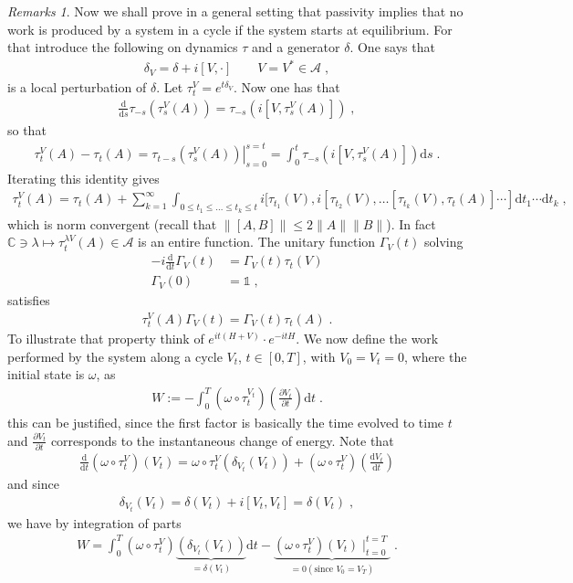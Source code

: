 \documentclass[
a4paper, %
11pt, %
onecolumn, %
openany, %
]{memoir}
\theoremstyle{definition}
\theoremstyle{remark}
\newtheorem{remarks}{Remarks}[chapter]
\theoremstyle{plain}
\begin{document}
\begin{remarks}
Now we shall prove in a general setting that passivity implies that no work is produced by a system in a cycle if the system starts at equilibrium. For that introduce the following on dynamics $\tau$ and a generator $\delta$. One says that \begin{align}
\delta_V=\delta + i[V,\cdot] \qquad V=V^*\in\mathcal{A}\; ,
\end{align}
is a local perturbation of $\delta$. Let $\tau_t^V=e^{t\delta_V}$. Now one has that \begin{align}
\frac{\mathrm{d}}{\mathrm{d}s}\tau_{-s}(\tau_s^V(A))=\tau_{-s}(i[V,\tau_s^V(A)])\; ,
\end{align}
so that \begin{align}
\left.\tau_t^V(A)-\tau_t(A)=\tau_{t-s}(\tau_s^V(A))\right|_{s=0}^{s=t}=\int_0^t\tau_{-s}(i[V,\tau_s^V(A)])\mathrm{d}s\; .
\end{align}
Iterating this identity gives \begin{align}
\tau_t^V(A)=\tau_t(A)+\sum_{k=1}^{\infty}\int_{{0\leq t_1\leq \ldots\leq t_k\leq t}} i[\tau_{t_1}(V),i[\tau_{t_2}(V),\ldots [\tau_{t_k}(V),\tau_t(A)]\cdots ]\mathrm{d}t_1\cdots \mathrm{d}t_k\; ,
\end{align}
which is norm convergent (recall that $\|[A,B]\|\leq 2\| A \| \| B\| $). In fact $\mathbb{C}\ni \lambda \mapsto \tau_t^{\lambda V}(A)\in\mathcal{A}$ is an entire function. The unitary function $\Gamma_V(t)$ solving \begin{align}
-i\frac{\mathrm{d}}{\mathrm{d}t}\Gamma_V(t)&=\Gamma_V(t)\tau_t(V)\\
\Gamma_V(0)&=\mathds{1}\;,
\end{align}
satisfies \begin{align}
\tau_t^V(A)\Gamma_V(t)=\Gamma_V(t)\tau_t(A)\; .
\end{align}
To illustrate that property think of $e^{it(H+V)}\cdot e^{-itH}$. We now define the work performed by the system along a cycle $V_t$, $t\in[0,T]$, with $V_0=V_t=0$, where the initial state is $\omega$, as \begin{align}
W:=-\int_0^T(\omega\circ \tau_t^{V_t})\left(\frac{\partial V_t}{\partial t}\right)\mathrm{d}t\; .
\end{align}
this can be justified, since the first factor is basically the time evolved to time $t$ and $\frac{\partial V_t}{\partial t}$ corresponds to the instantaneous change of energy. Note that \begin{align}
\frac{\mathrm{d}}{\mathrm{d}t}(\omega\circ \tau_t^V)(V_t)=\omega\circ \tau_t^V(\delta_{V_t}(V_t))+(\omega\circ \tau_t^V)\left(\frac{\mathrm{d}V_t}{\mathrm{d}t}\right)
\end{align}
and since \begin{align}
\delta_{V_t}(V_t)=\delta(V_t)+i[V_t,V_t]=\delta(V_t)\; ,
\end{align}
we have by integration of parts \begin{align}
W=\int_0^T(\omega\circ \tau_t^V)\underbrace{(\delta_{V_t}(V_t))}_{=\delta(V_t)}\mathrm{d}t-\underbrace{(\omega\circ\tau_t^V)(V_t)\mid_{t=0}^{t=T}}_{=0 (\text{since } V_0=V_T)}\;.
\end{align}
\end{remarks}
\end{document}
